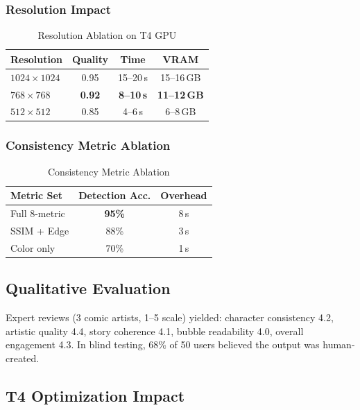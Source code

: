\documentclass[11pt,a4paper,twocolumn]{article}
\begin{document}
\subsubsection{Resolution Impact}

\begin{table}[H]
\caption{Resolution Ablation on T4 GPU}
\centering
\scriptsize
\begin{tabular}{lccc}
\toprule
\textbf{Resolution} & \textbf{Quality} & \textbf{Time} & \textbf{VRAM} \\
\midrule
$1024 \times 1024$ & 0.95 & 15--20\,s & 15--16\,GB \\
$768 \times 768$ & \textbf{0.92} & \textbf{8--10\,s} & \textbf{11--12\,GB} \\
$512 \times 512$ & 0.85 & 4--6\,s & 6--8\,GB \\
\bottomrule
\end{tabular}
\end{table}

\subsubsection{Consistency Metric Ablation}

\begin{table}[H]
\caption{Consistency Metric Ablation}
\centering
\scriptsize
\begin{tabular}{lcc}
\toprule
\textbf{Metric Set} & \textbf{Detection Acc.} & \textbf{Overhead} \\
\midrule
Full 8-metric & \textbf{95\%} & 8\,s \\
SSIM + Edge & 88\% & 3\,s \\
Color only & 70\% & 1\,s \\
\bottomrule
\end{tabular}
\end{table}

\subsection{Qualitative Evaluation}

Expert reviews (3 comic artists, 1--5 scale) yielded: character consistency 4.2, artistic quality 4.4, story coherence 4.1, bubble readability 4.0, overall engagement 4.3. In blind testing, 68\% of 50 users believed the output was human-created.

\subsection{T4 Optimization Impact}
\end{document}
